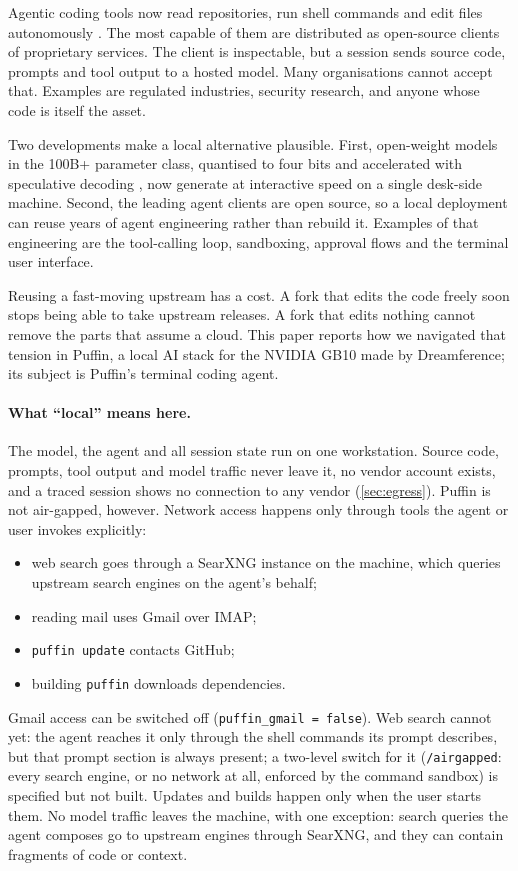 \documentclass[11pt]{article}
\newcommand{\code}[1]{\texttt{#1}}
\begin{document}
Agentic coding tools now read repositories, run shell commands and edit files autonomously
\cite{yao2023react,yang2024sweagent,wang2024openhands}. The most capable of them are distributed as
open-source clients of proprietary services. The client is inspectable, but a session sends source
code, prompts and tool output to a hosted model. Many organisations cannot accept that. Examples
are regulated industries, security research, and anyone whose code is itself the asset.

Two developments make a local alternative plausible. First, open-weight models in the 100B+
parameter class, quantised to four bits \cite{cheng2023autoround} and accelerated with speculative
decoding \cite{leviathan2023speculative,chen2026dflash}, now generate at interactive speed on a
single desk-side machine. Second, the leading agent clients are open source, so a local deployment
can reuse years of agent engineering rather than rebuild it. Examples of that engineering are the
tool-calling loop, sandboxing, approval flows and the terminal user interface.

Reusing a fast-moving upstream has a cost. A fork that edits the code freely soon stops being able
to take upstream releases. A fork that edits nothing cannot remove the parts that assume a cloud.
This paper reports how we navigated that tension in Puffin, a local AI stack for the NVIDIA GB10
made by Dreamference; its subject is Puffin's terminal coding agent.

\paragraph{What ``local'' means here.} The model, the agent and all session state run on one
workstation. Source code, prompts, tool output and model traffic never leave it, no vendor
account exists, and a traced session shows no connection to any vendor
(\cref{sec:egress}). Puffin is not air-gapped, however. Network access happens only through tools the
agent or user invokes explicitly:
\begin{itemize}
  \item web search goes through a SearXNG \cite{searxng} instance on the machine, which queries
    upstream search engines on the agent's behalf;
  \item reading mail uses Gmail over IMAP;
  \item \code{puffin update} contacts GitHub;
  \item building \code{puffin} downloads dependencies.
\end{itemize}
Gmail access can be switched off (\code{puffin\_gmail = false}). Web search cannot yet: the
agent reaches it only through the shell commands its prompt describes, but that prompt section is
always present; a two-level switch for it (\code{/airgapped}: every search engine, or no network
at all, enforced by the command sandbox) is specified but not built.
Updates and builds happen only when the user starts them. No model traffic leaves
the machine, with one exception: search queries the agent composes go to upstream engines through
SearXNG, and they can contain fragments of code or context.
\end{document}
